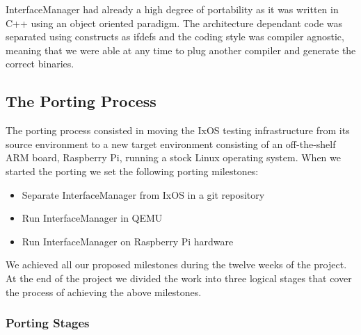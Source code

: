 InterfaceManager had already a high degree of portability as it was written
in C++ using an object oriented paradigm. The architecture dependant code was
separated using constructs as ifdefs and the coding style was compiler agnostic,
meaning that we were able at any time to plug another compiler and generate the
correct binaries.

\subsection{The Porting Process}

The porting process consisted in moving the IxOS testing infrastructure from its
source environment to a new target environment consisting of an off-the-shelf
ARM board, Raspberry Pi, running a stock Linux operating system. When we started
the porting we set the following porting milestones:
\begin{itemize}
    \item Separate InterfaceManager from IxOS in a git repository
    \item Run InterfaceManager in QEMU
    \item Run InterfaceManager on Raspberry Pi hardware
\end{itemize}
We achieved all our proposed milestones during the twelve weeks of the project.
At the end of the project we divided the work into three logical stages
that cover the process of achieving the above milestones.

\subsubsection{Porting Stages}

